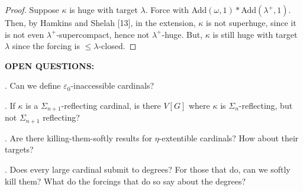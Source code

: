 \documentclass[10pt,leqno]{amsart}
\begin{document}
 \begin{proof} Suppose $\kappa$ is huge with target $\lambda$. Force with Add$(\omega,1)*$Add$(\lambda^+,1)$. Then, by Hamkins and Shelah [13], in the extension, $\kappa$ is not superhuge, since it is not even $\lambda^+$-supercompact, hence not $\lambda^+$-huge. But, $\kappa$ is still huge with target $\lambda$ since the forcing is $\le \lambda$-closed.
\end{proof}
\vspace{.5 in}
\begin{center}\textbf{OPEN QUESTIONS:}\end{center} 
\vspace{.2 in}
. Can we define $\varepsilon_0$-inaccessible cardinals? 

. If $\kappa$ is a $\Sigma_{n + 1}$-reflecting cardinal, is there $V[G]$ where $\kappa$ is $\Sigma_n$-reflecting, but not $\Sigma_{n+1}$ reflecting?

. Are there killing-them-softly results for $\eta$-extentible cardinals? How about their targets?

. Does every large cardinal submit to degrees? For those that do, can we softly kill them? What do the forcings that do so say about the degrees?


\vspace{.5 in}
\end{document}
